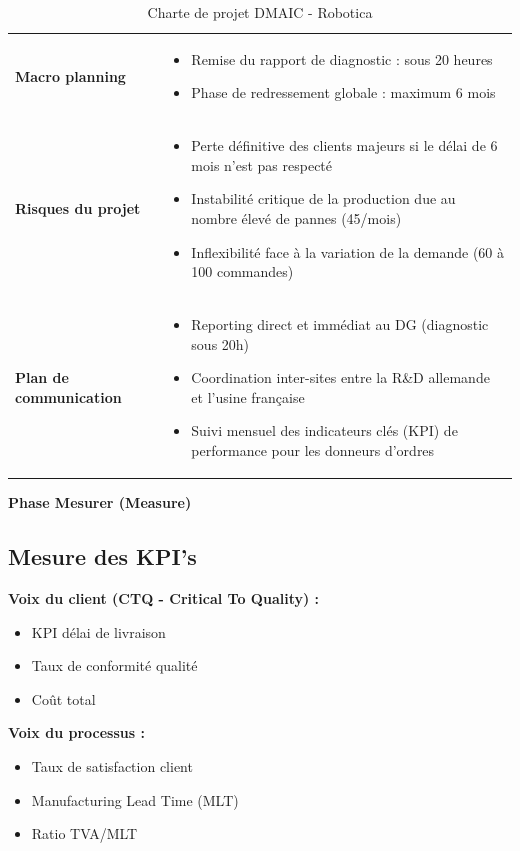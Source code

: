 \documentclass[11pt,a4paper]{article}
\newcommand{\subsectionbox}[1]{%
  \vspace{0.3em}
  \noindent\colorbox{secondcolor}{\parbox{\dimexpr\textwidth-2\fboxsep}{%
    \color{white}\large\bfseries #1%
  }}%
  \vspace{0.3em}
}
\begin{document}
\begin{table}[H]
\begin{tabularx}{\textwidth}{@{}lX@{}}
\textbf{Macro planning} & 
\begin{itemize}[nosep,leftmargin=1em]
  \item Remise du rapport de diagnostic : sous 20 heures
  \item Phase de redressement globale : maximum 6 mois
\end{itemize} \\
\rowcolor{lightgray}
\textbf{Risques du projet} & 
\begin{itemize}[nosep,leftmargin=1em]
  \item Perte définitive des clients majeurs si le délai de 6 mois n'est pas respecté
  \item Instabilité critique de la production due au nombre élevé de pannes (45/mois)
  \item Inflexibilité face à la variation de la demande (60 à 100 commandes)
\end{itemize} \\
\textbf{Plan de communication} & 
\begin{itemize}[nosep,leftmargin=1em]
  \item Reporting direct et immédiat au DG (diagnostic sous 20h)
  \item Coordination inter-sites entre la R\&D allemande et l'usine française
  \item Suivi mensuel des indicateurs clés (KPI) de performance pour les donneurs d'ordres
\end{itemize} \\
\bottomrule
\end{tabularx}
\caption{Charte de projet DMAIC - Robotica}
\end{table}

\newpage
\subsectionbox{Phase Mesurer (Measure)}

\subsection{Mesure des KPI's}

\textbf{Voix du client (CTQ - Critical To Quality) :}
\begin{itemize}[leftmargin=*,itemsep=0.3em]
  \item KPI délai de livraison
  \item Taux de conformité qualité
  \item Coût total
\end{itemize}

\textbf{Voix du processus :}
\begin{itemize}[leftmargin=*,itemsep=0.3em]
  \item Taux de satisfaction client
  \item Manufacturing Lead Time (MLT)
  \item Ratio TVA/MLT
\end{itemize}
\end{document}
